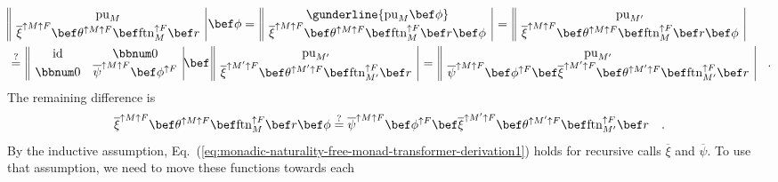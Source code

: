 \begin{align*}
 & \begin{array}{||c|}
\text{pu}_{M}\\
\overline{\xi}^{\uparrow M\uparrow F}\bef\theta^{\uparrow M\uparrow F}\bef\text{ftn}_{M}^{\uparrow F}\bef r
\end{array}\,\bef\phi=\,\begin{array}{||c|}
\gunderline{\text{pu}_{M}\bef\phi}\\
\overline{\xi}^{\uparrow M\uparrow F}\bef\theta^{\uparrow M\uparrow F}\bef\text{ftn}_{M}^{\uparrow F}\bef r\bef\phi
\end{array}\,=\,\begin{array}{||c|}
\text{pu}_{M^{\prime}}\\
\overline{\xi}^{\uparrow M\uparrow F}\bef\theta^{\uparrow M\uparrow F}\bef\text{ftn}_{M}^{\uparrow F}\bef r\bef\phi
\end{array}\\
 & \overset{?}{=}\,\begin{array}{||cc|}
\text{id} & \bbnum 0\\
\bbnum 0 & \overline{\psi}^{\uparrow M\uparrow F}\bef\phi^{\uparrow F}
\end{array}\bef\,\begin{array}{||c|}
\text{pu}_{M^{\prime}}\\
\overline{\xi}^{\uparrow M^{\prime}\uparrow F}\bef\theta^{\uparrow M^{\prime}\uparrow F}\bef\text{ftn}_{M^{\prime}}^{\uparrow F}\bef r
\end{array}\,=\,\begin{array}{||c|}
\text{pu}_{M^{\prime}}\\
\overline{\psi}^{\uparrow M\uparrow F}\bef\phi^{\uparrow F}\bef\overline{\xi}^{\uparrow M^{\prime}\uparrow F}\bef\theta^{\uparrow M^{\prime}\uparrow F}\bef\text{ftn}_{M^{\prime}}^{\uparrow F}\bef r
\end{array}\quad.
\end{align*}
The remaining difference is
\[
\overline{\xi}^{\uparrow M\uparrow F}\bef\theta^{\uparrow M\uparrow F}\bef\text{ftn}_{M}^{\uparrow F}\bef r\bef\phi\overset{?}{=}\overline{\psi}^{\uparrow M\uparrow F}\bef\phi^{\uparrow F}\bef\overline{\xi}^{\uparrow M^{\prime}\uparrow F}\bef\theta^{\uparrow M^{\prime}\uparrow F}\bef\text{ftn}_{M^{\prime}}^{\uparrow F}\bef r\quad.
\]
By the inductive assumption, Eq.~(\ref{eq:monadic-naturality-free-monad-transformer-derivation1})
holds for recursive calls $\overline{\xi}$ and $\overline{\psi}$.
To use that assumption, we need to move these functions towards each
